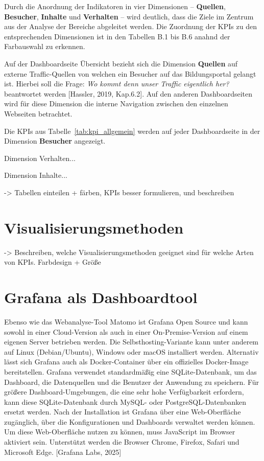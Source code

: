 Durch die Anordnung der Indikatoren in vier Dimensionen – \textbf{Quellen}, \textbf{Besucher}, \textbf{Inhalte} und \textbf{Verhalten} – wird deutlich, dass die Ziele im Zentrum aus der Analyse der Bereiche abgeleitet werden. Die Zuordnung der KPIs zu den entsprechenden Dimensionen ist in den Tabellen B.1 bis B.6 anahnd der Farbauswahl zu erkennen.

Auf der Dashboardseite \glqq Übersicht\grqq{} bezieht sich die Dimension \textbf{Quellen} auf externe Traffic-Quellen von welchen ein Besucher auf das Bildungsportal gelangt ist. Hierbei soll die Frage: \textit{\glqq Wo kommt denn unser Traffic eigentlich her?\grqq{}} beantwortet werden [Hassler, 2019, Kap.6.2]. Auf den anderen Dashboardseiten wird für diese Dimension die interne Navigation zwischen den einzelnen Webseiten betrachtet. 

Die KPIs aus Tabelle~\ref{tab:kpi_allgemein} werden auf jeder Dashboardseite in der Dimension \textbf{Besucher} angezeigt.

Dimension Verhalten...

Dimension Inhalte...

-> Tabellen einteilen + färben, KPIs besser formulieren, und beschreiben

\section{Visualisierungsmethoden}
\label{sec:Visualisierungsmethoden}
-> Beschreiben, welche Visualisierungsmethoden geeignet sind für welche Arten von KPIs. Farbdesign + Größe

\section{Grafana als Dashboardtool}
Ebenso wie das Webanalyse-Tool Matomo ist Grafana Open Source und kann sowohl in einer Cloud-Version als auch in einer On-Premise-Version auf einem eigenen Server betrieben werden. Die Selbsthosting-Variante kann unter anderem auf Linux (Debian/Ubuntu), Windows oder macOS installiert werden. Alternativ lässt sich Grafana auch als Docker-Container über ein offizielles Docker-Image bereitstellen. Grafana verwendet standardmäßig eine SQLite-Datenbank, um das Dashboard, die Datenquellen und die Benutzer der Anwendung zu speichern. Für größere Dashboard-Umgebungen, die eine sehr hohe Verfügbarkeit erfordern, kann diese SQLite-Datenbank durch MySQL- oder PostgreSQL-Datenbanken ersetzt werden. Nach der Installation ist Grafana über eine Web-Oberfläche zugänglich, über die Konfigurationen und Dashboards verwaltet werden können. Um diese Web-Oberfläche nutzen zu können, muss JavaScript im Browser aktiviert sein. Unterstützt werden die Browser Chrome, Firefox, Safari und Microsoft Edge. [Grafana Labs, 2025]

